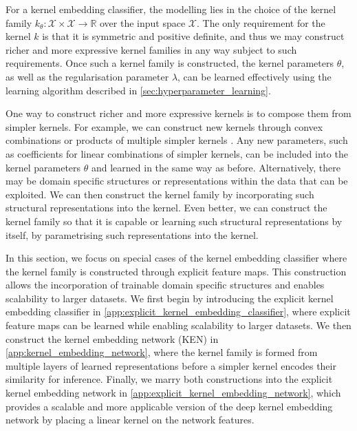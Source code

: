 \documentclass{article}
\begin{document}
	For a kernel embedding classifier, the modelling lies in the choice of the kernel family $k_{\theta} : \mathcal{X} \times \mathcal{X} \to \mathbb{R}$ over the input space $\mathcal{X}$. The only requirement for the kernel $k$ is that it is symmetric and positive definite, and thus we may construct richer and more expressive kernel families in any way subject to such requirements. Once such a kernel family is constructed, the kernel parameters $\theta$, as well as the regularisation parameter $\lambda$, can be learned effectively using the learning algorithm described in \cref{sec:hyperparameter_learning}.
	
	One way to construct richer and more expressive kernels is to compose them from simpler kernels. For example, we can construct new kernels through convex combinations or products of multiple simpler kernels \citep{genton2001classes}. Any new parameters, such as coefficients for linear combinations of simpler kernels, can be included into the kernel parameters $\theta$ and learned in the same way as before. Alternatively, there may be domain specific structures or representations within the data that can be exploited. We can then construct the kernel family by incorporating such structural representations into the kernel. Even better, we can construct the kernel family so that it is capable or learning such structural representations by itself, by parametrising such representations into the kernel.
	
	In this section, we focus on special cases of the kernel embedding classifier where the kernel family is constructed through explicit feature maps. This construction allows the incorporation of trainable domain specific structures and enables scalability to larger datasets. We first begin by introducing the explicit kernel embedding classifier in \cref{app:explicit_kernel_embedding_classifier}, where explicit feature maps can be learned while enabling scalability to larger datasets. We then construct the kernel embedding network (KEN) in \cref{app:kernel_embedding_network}, where the kernel family is formed from multiple layers of learned representations before a simpler kernel encodes their similarity for inference. Finally, we marry both constructions into the explicit kernel embedding network in \cref{app:explicit_kernel_embedding_network}, which provides a scalable and more applicable version of the deep kernel embedding network by placing a linear kernel on the network features.
\end{document}
